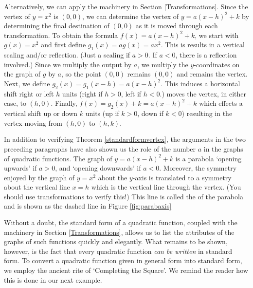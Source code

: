\smallskip

Alternatively, we can apply the machinery in Section \ref{Transformations}. Since the vertex of $y = x^2$ is $(0,0)$, we can determine the vertex of $y = a(x-h)^2+k$ by determining the final destination of $(0,0)$ as it is moved through each transformation. To obtain the formula $f(x)= a(x-h)^2+k$, we start with $g(x)=x^2$ and first define $g_{1}(x) = a g(x) = ax^2$.  This is results in a  vertical scaling and/or reflection. (Just a scaling if $a>0$.  If $a<0$, there is a reflection involved.)  Since we multiply the output by $a$, we multiply the $y$-coordinates on the graph of $g$  by $a$, so the point $(0,0)$ remains $(0,0)$ and remains the vertex.  Next, we define $g_{2}(x) = g_{1}(x-h) = a(x-h)^2$.  This induces a horizontal shift right or left $h$ units (right if $h>0$, left if $h<0$.) moves the vertex, in either case,  to $(h,0)$.  Finally, $f(x) = g_{2}(x)+k = a(x-h)^2+k$ which effects a vertical shift up or down $k$ units (up if $k>0$, down if $k<0$) resulting in the vertex moving from $(h,0)$ to $(h,k)$.

\smallskip

In addition to verifying Theorem \ref{standardformvertex},  the arguments in the two preceding paragraphs have also shown us the role of the number $a$ in the graphs of quadratic functions. The graph of $y = a(x-h)^2 + k$ is a parabola `opening upwards' if $a > 0$, and `opening downwards' if $a < 0$. Moreover, the symmetry enjoyed by the graph of $y = x^2$ about the $y$-axis is translated to a symmetry about the vertical line $x=h$ which is the vertical line through the vertex. (You should use transformations to verify this!) This line is called the  of the parabola and is shown as the dashed line in Figure \ref{fig:parabaxis}


Without a doubt, the standard form of a quadratic function, coupled with the machinery in Section \ref{Transformations}, allows us to list the attributes of the graphs of such functions quickly and elegantly.  What remains to be shown, however, is the fact that every quadratic function \textit{can be written} in standard form.  To convert a quadratic function given in general form into standard form, we employ the ancient rite of `Completing the Square'.  We remind the reader how this is done in our next example.

